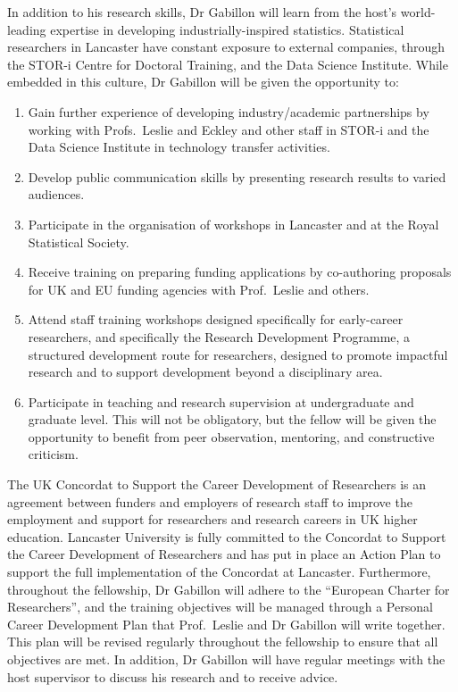 \documentclass[a4paper,11pt]{article}
\begin{document}
In addition to his research skills, Dr Gabillon will learn from the host's world-leading expertise in developing industrially-inspired statistics.  Statistical researchers in Lancaster have constant exposure to external companies, through the STOR-i Centre for Doctoral Training, and the Data Science Institute.  While embedded in this culture, Dr Gabillon will be given the opportunity to:
\begin{enumerate}
\item Gain further experience of developing industry/academic partnerships by working with Profs.\ Leslie and Eckley and other staff in STOR-i and the Data Science Institute in technology transfer activities.
\item Develop public communication skills by presenting research results to varied audiences.
\item Participate in the organisation of workshops in Lancaster and at the Royal Statistical Society.
\item Receive training on preparing funding applications by co-authoring proposals for UK and EU funding agencies with Prof.\ Leslie and others.
\item Attend staff training workshops designed specifically for early-career researchers, and specifically the Research Development Programme, a structured development route for researchers, designed to promote impactful research and to support development beyond a disciplinary area.
\item Participate in teaching and research supervision at undergraduate and graduate level.  This will not be obligatory, but the fellow will be given the opportunity to benefit from peer observation, mentoring, and constructive criticism.
\end{enumerate}

The UK Concordat to Support the Career Development of Researchers is an agreement between funders and employers of research staff to improve the employment and support for researchers and research careers in UK higher education.  Lancaster University is fully committed to the Concordat to Support the Career Development of Researchers and has put in place an Action Plan to support the full implementation of the Concordat at Lancaster.  Furthermore, throughout the fellowship, Dr Gabillon will adhere to the ``European Charter for Researchers'', and the training objectives will be managed through a Personal Career Development Plan that Prof.\ Leslie and Dr Gabillon will write together.  This plan will be revised regularly throughout the fellowship to ensure that all objectives are met.  In addition, Dr Gabillon will have regular meetings with the host supervisor to discuss his research and to receive advice.
\end{document}
